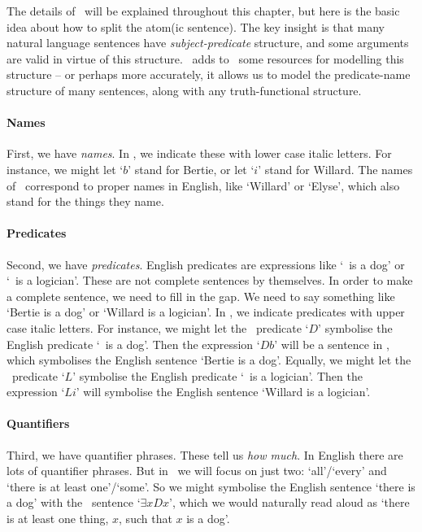 The details of \FOL\ will be explained throughout this chapter, but here is the basic idea about how to split the atom(ic sentence). The key insight is that many natural language sentences have \emph{subject-predicate} structure, and some arguments are valid in virtue of this structure. \FOL\ adds to \TFL\ some resources for modelling this structure – or perhaps more accurately, it allows us to model the predicate-name structure of many sentences, along with any truth-functional structure.

\paragraph{Names} First, we have \emph{names}. In \FOL, we indicate these with lower case italic letters. For instance, we might let `$b$' stand for Bertie, or let `$i$' stand for Willard. The names of \FOL\ correspond to proper names in English, like `Willard' or `Elyse', which also stand for the things they name. 

\paragraph{Predicates} Second, we have \emph{predicates}. English predicates are expressions like `\blank\ is a dog' or `\blank\ is a logician'. These are not complete sentences by themselves. In order to make a complete sentence, we need to fill in the gap. We need to say something like `Bertie is a dog' or `Willard is a logician'. In \FOL, we indicate predicates with upper case italic letters. For instance, we might let the \FOL\ predicate `$D$' symbolise the English predicate `\blank\ is a dog'. Then the expression `$Db$' will be a sentence in \FOL, which symbolises the English sentence `Bertie is a dog'. Equally, we might let the \FOL\ predicate `$L$' symbolise the English predicate `\blank\ is a logician'. Then the expression `$Li$' will symbolise the English sentence `Willard is a logician'.

\paragraph{Quantifiers} Third, we have quantifier phrases. These tell us \emph{how much}. In English there are lots of quantifier phrases. But in \FOL\ we will focus on just two:  `all'/`every' and `there is at least one'/`some'. So we might symbolise the English sentence `there is a dog' with the \FOL\ sentence `$\exists x Dx$', which we would naturally read aloud as `there is at least one thing, $x$, such that $x$ is a dog'.

